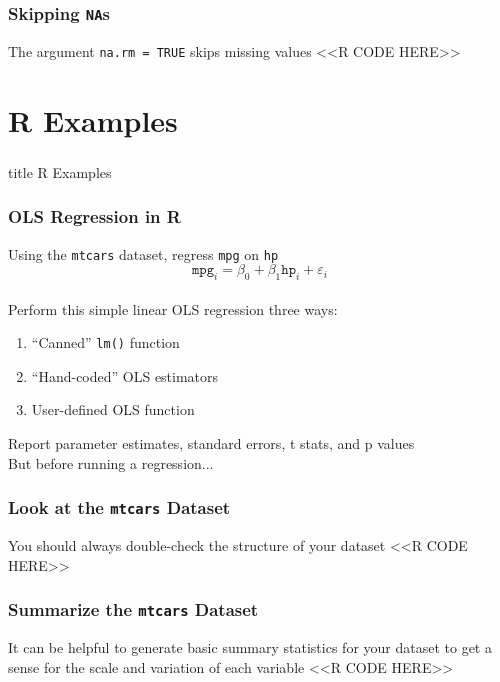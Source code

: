 \documentclass{beamer}
\begin{document}
\begin{frame}[fragile]\frametitle{Skipping \texttt{NA}s}
    The argument \texttt{na.rm = TRUE} skips missing values
    <<R CODE HERE>>
\end{frame}

\section{R Examples}
\label{examples}
\begin{frame}\frametitle{}
    \vfill
    \centering
    \begin{beamercolorbox}[center]{title}
        \Large R Examples
    \end{beamercolorbox}
    \vfill
\end{frame}

\begin{frame}\frametitle{OLS Regression in R}
    Using the \texttt{mtcars} dataset, regress \texttt{mpg} on \texttt{hp}
    $$\texttt{mpg}_i = \beta_0 + \beta_1 \texttt{hp}_i + \varepsilon_i$$ \\
    \vspace{2ex}
    Perform this simple linear OLS regression three ways:
    \begin{enumerate}
        \item ``Canned'' \texttt{lm()} function
        \item ``Hand-coded'' OLS estimators
        \item User-defined OLS function 
    \end{enumerate}
    \vspace{2ex}
    Report parameter estimates, standard errors, t stats, and p values \\
    \vspace{2ex}
    But before running a regression...
\end{frame}

\begin{frame}[fragile]\frametitle{Look at the \texttt{mtcars} Dataset}
    You should always double-check the structure of your dataset
    <<R CODE HERE>>
\end{frame}

\begin{frame}[fragile]\frametitle{Summarize the \texttt{mtcars} Dataset}
    It can be helpful to generate basic summary statistics for your dataset to get a sense for the scale and variation of each variable
    <<R CODE HERE>>
\end{frame}
\end{document}
